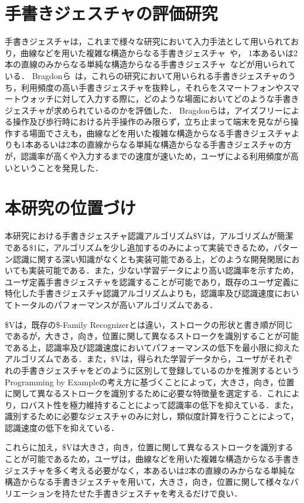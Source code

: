 \section{手書きジェスチャの評価研究}
手書きジェスチャは，これまで様々な研究において入力手法として用いられており，曲線などを用いた複雑な構造からなる手書きジェスチャ~\cite{Lu:2011:GAT:1978942.1978972,Li:2010:GST:1866029.1866044,Moran:1997:PIT:263407.263508,Hinckley:2007:ISS:1240624.1240666,Appert:2009:USC:1518701.1519052,Liao:2008:PGC:1314683.1314686,Zeleznik:2008:LCD:1449715.1449741}や，
1本あるいは2本の直線のみからなる単純な構造からなる手書きジェスチャ~\cite{Kurtenbach:1993:LEP:164632.164977}などが用いられている．
Bragdonら~\cite{Bragdon:2011:EAT:1978942.1979000}は，これらの研究において用いられる手書きジェスチャのうち，利用頻度の高い手書きジェスチャを抜粋し，それらをスマートフォンやスマートウォッチに対して入力する際に，どのような場面においてどのような手書きジェスチャが求められているのかを評価した．
Bragdonらは，アイズフリーによる操作及び歩行時における片手操作のみ限らず，立ち止まって端末を見ながら操作する場面でさえも，曲線などを用いた複雑な構造からなる手書きジェスチャよりも1本あるいは2本の直線からなる単純な構造からなる手書きジェスチャの方が，認識率が高くや入力するまでの速度が速いため，ユーザによる利用頻度が高いということを発見した．

\section{本研究の位置づけ}
本研究における手書きジェスチャ認識アルゴリズム\$Vは，アルゴリズムが簡潔である\$1に，アルゴリズムを少し追加するのみによって実装できるため，パターン認識に関する深い知識がなくとも実装可能である上，どのような開発閑居においても実装可能である．また，少ない学習データにより高い認識率を示すため，ユーザ定義手書きジェスチャを認識することが可能であり，既存のユーザ定義に特化した手書きジェスチャ認識アルゴリズムよりも，認識率及び認識速度においてトータルのパフォーマンスが高いアルゴリズムである．

\$Vは，既存の\$-Family Recognizerとは違い，ストロークの形状と書き順が同じであるが，大きさ，向き，位置に関して異なるストロークを識別することが可能である上，認識率及び認識速度においてパフォーマンスの低下を最小限に抑えたアルゴリズムである．また，\$Vは，得られた学習データから，ユーザがそれぞれの手書きジェスチャをどのように区別して登録しているのかを推測するというProgramming by Exampleの考え方に基づくことによって，大きさ，向き，位置に関して異なるストロークを識別するために必要な特徴量を選定する．これにより，ロバスト性を極力維持することによって認識率の低下を抑えている．また，識別するために必要なジェスチャのみに対し，類似度計算を行うことによって，認識速度の低下を抑えている．

これらに加え，\$Vは大きさ，向き，位置に関して異なるストロークを識別することが可能であるため，ユーザは，曲線などを用いた複雑な構造からなる手書きジェスチャを多く考える必要がなく，本あるいは2本の直線のみからなる単純な構造からなる手書きジェスチャを用いて，大きさ，向き，位置に関して様々なバリエーションを持たせた手書きジェスチャを考えるだけで良い．





